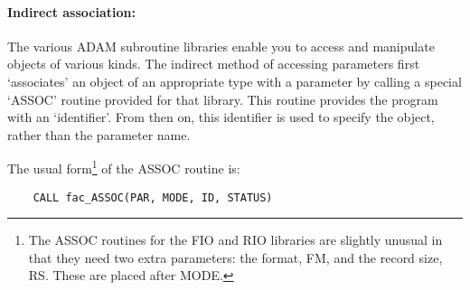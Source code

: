 \paragraph{Indirect association:}\hfill

The various ADAM subroutine libraries enable you to access and manipulate
objects of various kinds.
The indirect method of accessing parameters first `associates' an object of an
appropriate type with a parameter by calling a special `ASSOC' routine
provided for that library.
This routine provides the program with an `identifier'.
From then on, this identifier is used to specify the object, rather than the
parameter name.

The usual form\footnote{The ASSOC routines for the FIO and RIO libraries are
slightly unusual in that they need two extra parameters: the format, FM, and
the record size, RS. These are placed after MODE.} of the ASSOC routine is:

\begin{small}
\begin{verbatim}
    CALL fac_ASSOC(PAR, MODE, ID, STATUS)
\end{verbatim}
\end{small}

